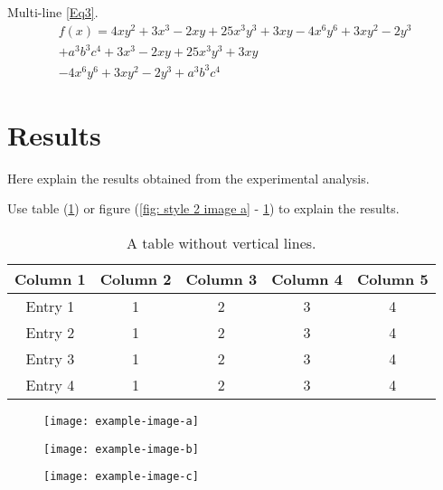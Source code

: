Multi-line \cref{Eq3}.
\begin{multline}
	f(x) = 4xy^2 + 3x^3 - 2xy + 25x^3y^3 + 3xy - 4x^6y^6 + 3xy^2 - 2y^3\\ + a^3b^3c^4 + 3x^3 - 2xy + 25x^3y^3 + 3xy\\ - 4x^6y^6 + 3xy^2 - 2y^3 + a^3b^3c^4
\label{Eq3}
\end{multline}



\section{Results}
Here explain the results obtained from the experimental analysis.

Use table (\cref{table: style 2}) or figure (\cref{fig: style 2 image a} - \cref{fig: style 2 image c}) to explain the results. 

\begin{table}[ht]
\centering
\caption{A table without vertical lines.}
\begin{tabular}[t]{ccccc}
\toprule
\textbf{Column 1}&\textbf{Column 2}&\textbf{Column 3}&\textbf{Column 4}&\textbf{Column 5}\\
\midrule
Entry 1&1&2&3&4\\
Entry 2&1&2&3&4\\
Entry 3&1&2&3&4\\
Entry 4&1&2&3&4\\
\bottomrule
\end{tabular}
\label{table: style 2}
\end{table}

\begin{figure}[H]
\centering
\begin{minipage}{0.3\textwidth}
  \centering
  \texttt{[image: example-image-a]}
  \label{fig: style 2 image a}
\end{minipage}
\hfill
\begin{minipage}{0.3\textwidth}
  \centering
  \texttt{[image: example-image-b]}
  \label{fig: style 2 image b}
\end{minipage}
\hfill
\begin{minipage}{0.3\textwidth}
  \centering
  \texttt{[image: example-image-c]}
  \label{fig: style 2 image c}
\end{minipage}
\end{figure}

